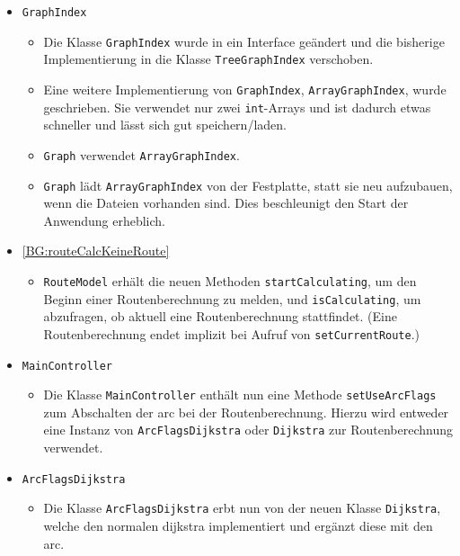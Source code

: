 \documentclass[a4paper, 11pt]{article}
\newcommand{\code}[1]{\texttt{#1}}
\begin{document}
\begin{itemize}
\item \code{GraphIndex}
  \begin{itemize}
  \item Die Klasse \code{GraphIndex} wurde in ein Interface geändert und die bisherige Implementierung in die Klasse \code{TreeGraphIndex} verschoben.
  \item Eine weitere Implementierung von \code{GraphIndex}, \code{ArrayGraphIndex}, wurde geschrieben.
  Sie verwendet nur zwei \code{int}-Arrays und ist dadurch etwas schneller und lässt sich gut speichern/laden.
  \item \code{Graph} verwendet \code{ArrayGraphIndex}.
  \item \code{Graph} lädt \code{ArrayGraphIndex} von der Festplatte, statt sie neu aufzubauen, wenn die Dateien vorhanden sind. Dies beschleunigt den Start der Anwendung erheblich.
  \end{itemize}
\item\label{change:routeCalcKeineRoute} \ref{BG:routeCalcKeineRoute}
  \begin{itemize}
  \item \code{RouteModel} erhält die neuen Methoden \code{startCalculating}, um den Beginn einer Routenberechnung zu melden, und \code{isCalculating}, um abzufragen, ob aktuell eine Routenberechnung stattfindet.
  (Eine Routenberechnung endet implizit bei Aufruf von \code{setCurrentRoute}.)
  \end{itemize}
  \item \code{MainController}
    \begin{itemize}
    \item Die Klasse \code{MainController} enthält nun eine Methode \code{setUseArcFlags} zum Abschalten der \gls{arc} bei der Routenberechnung. Hierzu wird entweder eine Instanz von \code{ArcFlagsDijkstra} oder \code{Dijkstra} zur Routenberechnung verwendet.
    \end{itemize}
  \item \code{ArcFlagsDijkstra}
    \begin{itemize}
    \item Die Klasse \code{ArcFlagsDijkstra} erbt nun von der neuen Klasse \code{Dijkstra}, welche den normalen \gls{dijkstra} implementiert und ergänzt diese mit den \gls{arc}.
    \end{itemize}
\end{itemize}

\makeatletter
{}
\makeatother
\printglossary[type=main, title={Glossar}, toctitle={Glossar}, style=myAltlist]
\end{document}

